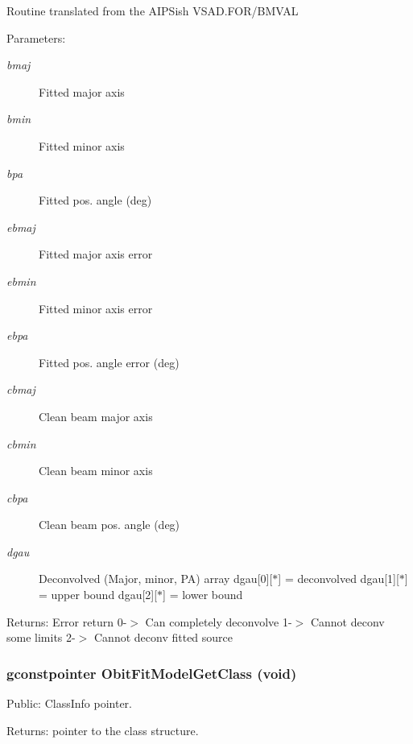 Routine translated from the AIPSish VSAD.FOR/BMVAL \begin{Desc}
\item[Parameters:]
\begin{description}
\item[{\em bmaj}]Fitted major axis \item[{\em bmin}]Fitted minor axis \item[{\em bpa}]Fitted pos. angle (deg) \item[{\em ebmaj}]Fitted major axis error \item[{\em ebmin}]Fitted minor axis error \item[{\em ebpa}]Fitted pos. angle error (deg) \item[{\em cbmaj}]Clean beam major axis \item[{\em cbmin}]Clean beam minor axis \item[{\em cbpa}]Clean beam pos. angle (deg) \item[{\em dgau}]Deconvolved (Major, minor, PA) array dgau[0][$\ast$] = deconvolved dgau[1][$\ast$] = upper bound dgau[2][$\ast$] = lower bound \end{description}
\end{Desc}
\begin{Desc}
\item[Returns:]Error return 0-$>$ Can completely deconvolve 1-$>$ Cannot deconv some limits 2-$>$ Cannot deconv fitted source \end{Desc}
\subsubsection{\setlength{\rightskip}{0pt plus 5cm}gconstpointer Obit\-Fit\-Model\-Get\-Class (void)}\label{ObitFitModel_8h_a13}


Public: Class\-Info pointer. 

\begin{Desc}
\item[Returns:]pointer to the class structure. \end{Desc}
